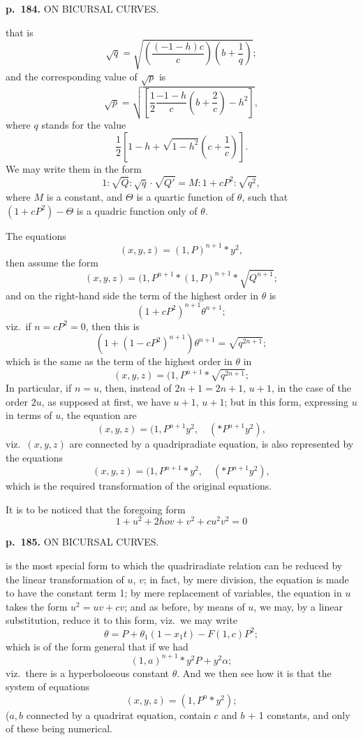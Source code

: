 \documentclass[11pt,a4paper]{book}
\begin{document}
\clearpage

\noindent
\textbf{p.~184.}  ON BICURSAL CURVES.

that is
\[
\sqrt{q} = \sqrt{\left( \frac{(-1 - h)c}{c} \right)(b + \frac{1}{q})};
\]
and the corresponding value of $\sqrt{p}$ is
\[
\sqrt{p} = \sqrt{\left[ \frac{1}{2} \frac{-1 - h}{c} \left( b + \frac{2}{c} \right) - h^2 \right]},
\]
where $q$ stands for the value
\[
\frac{1}{2}\left[1 - h + \sqrt{1 - h^2}\left( c + \frac{1}{c} \right)\right].
\]
We may write them in the form
\[
1 : \sqrt{Q} : \sqrt{q} \cdot \sqrt{Q'} = M : 1 + c P^2 : \sqrt{q^2},
\]
where $M$ is a constant, and $\Theta$ is a quartic function of $\theta$, such that $(1 + cP^2) - \Theta$ is a quadric function only of $\theta$.

The equations
\[
(x, y, z) = (1, P)^{n+1} \ast y^2,
\]
then assume the form
\[
(x, y, z) = (1, P^{n+1} \ast (1, P)^{n+1} \ast \sqrt{Q^{n+1}};
\]
and on the right-hand side the term of the highest order in $\theta$ is
\[
(1 + c P^2)^{n+1} \theta^{n+1};
\]
viz.\ if $n = c P^2 = 0$, then this is
\[
(1 + (1 - c P^2)^{n+1}) \theta^{n+1} = \sqrt{q^{2n+1}};
\]
which is the same as the term of the highest order in $\theta$ in
\[
(x, y, z) = (1, P^{n+1} \ast \sqrt{q^{2n+1}};
\]
In particular, if $n = u$, then, instead of $2n + 1 = 2n + 1$, $u + 1$, in the case of the order $2u$, as supposed at first, we have $u + 1$, $u + 1$; but in this form, expressing $u$ in terms of $u$, the equation are
\[
(x, y, z) = (1, P^{n+1} y^2, \quad (\ast P^{n+1} y^2),
\]
viz.\ $(x, y, z)$ are connected by a quadripradiate equation, is also represented by the equations
\[
(x, y, z) = (1, P^{n+1} \ast y^2, \quad (\ast P^{n+1} y^2),
\]
which is the required transformation of the original equations.

It is to be noticed that the foregoing form
\[
1 + u^2 + 2hov + v^2 + c u^2 v^2 = 0
\]

\clearpage

\noindent
\textbf{p.~185.}  ON BICURSAL CURVES.

is the most special form to which the quadriradiate relation can be reduced by the linear transformation of $u$, $v$; in fact, by mere division, the equation is made to have the constant term 1; by mere replacement of variables, the equation in $u$ takes the form $u^2 = uv + cv$; and as before, by means of $u$, we may, by a linear substitution, reduce it to this form, viz.\ we may write
\[
\theta = P + \theta_1(1 - x_1 t) - F(1, c)P^2;
\]
which is of the form general that if we had
\[
(1, a)^{n+1} \ast y^2 P + y^2 \alpha;
\]
viz.\ there is a hyperboloeous constant $\theta$. And we then see how it is that the system of equations
\[
(x, y, z) = (1, P^n \ast y^2);
\]
($a, b$ connected by a quadrirat equation, contain $c$ and $b$ + 1 constants, and only of these being numerical.
\end{document}
